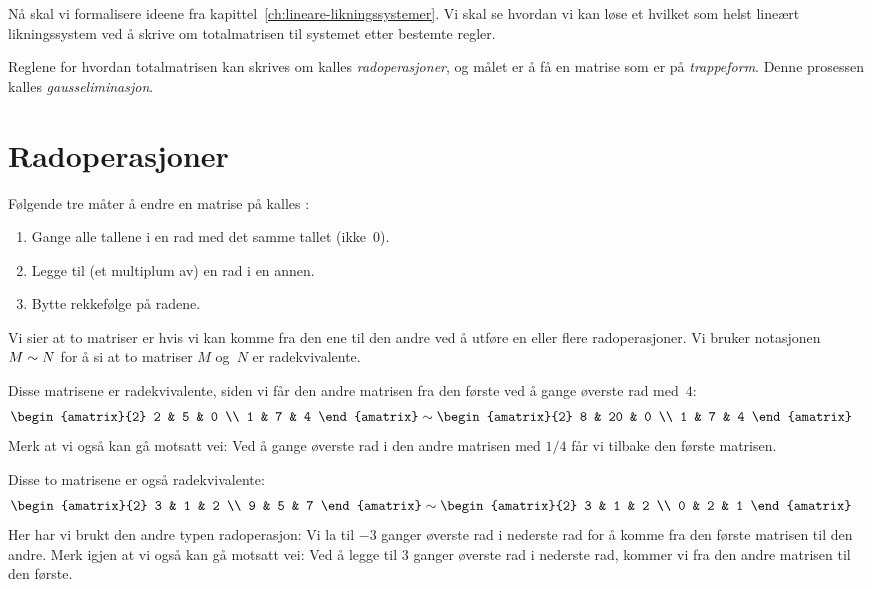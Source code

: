 

\label{ch:gausseliminasjon}

Nå skal vi formalisere ideene fra
kapittel~\ref{ch:lineare-likningssystemer}.  Vi skal se hvordan vi
kan løse et hvilket som helst lineært likningssystem ved å skrive om
totalmatrisen til systemet etter bestemte regler.

Reglene for hvordan totalmatrisen kan skrives om kalles
\emph{radoperasjoner}, og målet er å få en matrise som er på
\emph{trappeform}.  Denne prosessen kalles \emph{gausseliminasjon}.


\section*{Radoperasjoner}

Følgende tre måter å endre en matrise på kalles
:
\begin{enumerate}
\item Gange alle tallene i en rad med det samme tallet (ikke~$0$).
\item Legge til (et multiplum av) en rad i en annen.
\item Bytte rekkefølge på radene.
\end{enumerate}

Vi sier at to matriser er  hvis vi kan komme
fra den ene til den andre ved å utføre en eller flere radoperasjoner.
Vi bruker notasjonen $M \sim N$ for å si at to matriser $M$ og~$N$
er radekvivalente.

\begin{ex}
\label{ex:radekvivalent}
Disse matrisene er radekvivalente, siden vi får den andre matrisen fra
den første ved å gange øverste rad med~$4$:
\begin{align*}
\begin{amatrix}{2}
 2 & 5 & 0 \\
 1 & 7 & 4
\end{amatrix}
&\roweq
\begin{amatrix}{2}
 8 & 20 & 0 \\
 1 &  7 & 4
\end{amatrix}
\end{align*}
Merk at vi også kan gå motsatt vei: Ved å gange øverste rad i den
andre matrisen med $1/4$ får vi tilbake den første matrisen.

Disse to matrisene er også radekvivalente:
\begin{align*}
\begin{amatrix}{2}
 3 & 1 & 2 \\
 9 & 5 & 7
\end{amatrix}
&\roweq
\begin{amatrix}{2}
 3 & 1 & 2 \\
 0 & 2 & 1
\end{amatrix}
\end{align*}
Her har vi brukt den andre typen radoperasjon: Vi la til $-3$ ganger
øverste rad i nederste rad for å komme fra den første matrisen til den
andre.  Merk igjen at vi også kan gå motsatt vei: Ved å legge til $3$
ganger øverste rad i nederste rad, kommer vi fra den andre matrisen
til den første.
\end{ex}

